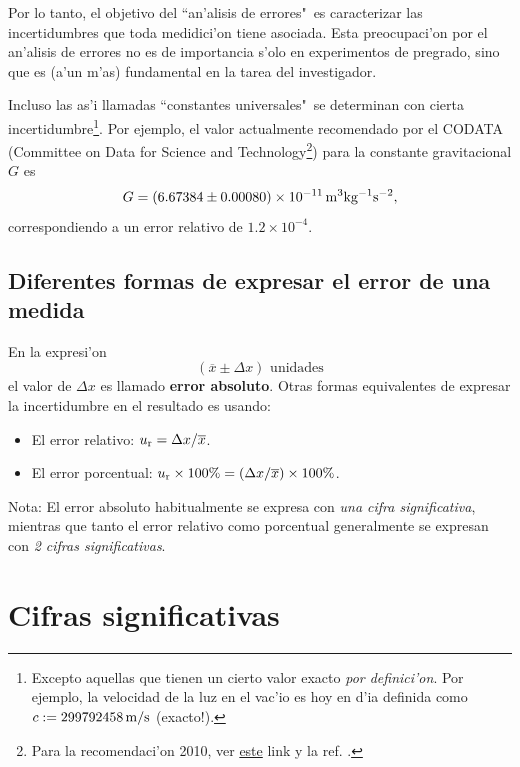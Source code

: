 \documentclass[a4paper]{report}
\begin{document}
Por lo tanto, el objetivo del ``an'alisis de errores"\, es caracterizar las incertidumbres que toda medidici'on tiene asociada. Esta preocupaci'on por el an'alisis de errores no es de importancia s'olo en experimentos de pregrado, sino que es (a'un m'as) fundamental en la tarea del investigador.

Incluso las as'i llamadas ``constantes universales"\, se determinan con cierta incertidumbre\footnote{Excepto aquellas que tienen un cierto valor exacto \textit{por definici'on}. Por ejemplo, la velocidad de la luz en el vac'io es hoy en d'ia definida como $c:=299792458\,{\rm m/s}$ (exacto!).}. Por ejemplo, el valor actualmente recomendado por el CODATA (Committee on Data for Science and Technology\footnote{Para la recomendaci'on 2010, ver \href{http://www.codata.org/committees-and-groups/fundamental-physical-constants/tgfc-previous-values-and-publications}{este} link y la ref. \cite{CODATA2010}.}) para la constante gravitacional $G$ es 
\begin{equation}\label{G}
G=(6.67384\pm 0.00080)\times 10^{-11}\,{\rm m^3kg^{-1}s^{-2}} ,
\end{equation}
correspondiendo a un error relativo de $1.2\times 10^{-4}$.

\subsection{Diferentes formas de expresar el error de una medida}

En la expresi'on
\begin{equation}
(\overline{x}\pm\Delta x) \text{ unidades}
\end{equation}
el valor de $\Delta x$ es llamado \textbf{error absoluto}. Otras formas equivalentes de expresar la incertidumbre en el resultado es usando:
\begin{itemize}
\item El error relativo:  $u_{\rm r}=\Delta x/\overline{x}$.
\item El error porcentual:  $u_{\rm r}\times 100\% = (\Delta x/\overline{x})\times 100\%$.
\end{itemize}

Nota: El error absoluto habitualmente se expresa con \textit{una cifra significativa}, mientras que tanto el error relativo como porcentual generalmente se expresan con \textit{2 cifras significativas}.

\section{Cifras significativas}
\end{document}
